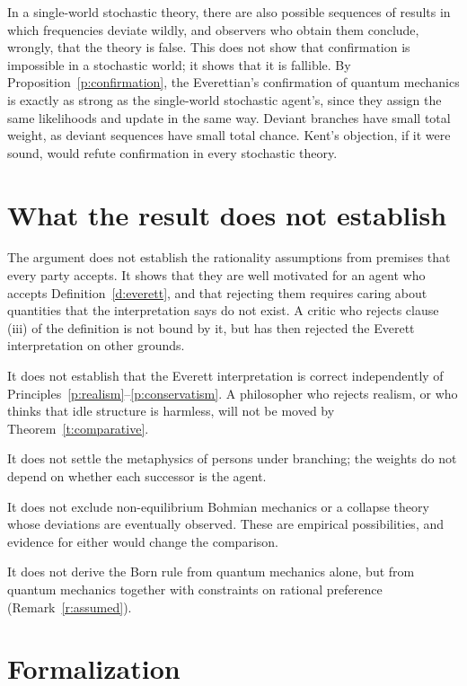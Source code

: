 \documentclass{situationist-preprint}
\begin{document}
\begin{reply}
In a single-world stochastic theory, there are also possible sequences of results in which frequencies deviate wildly, and observers who obtain them conclude, wrongly, that the theory is false. This does not show that confirmation is impossible in a stochastic world; it shows that it is fallible. By Proposition~\ref{p:confirmation}, the Everettian's confirmation of quantum mechanics is exactly as strong as the single-world stochastic agent's, since they assign the same likelihoods and update in the same way. Deviant branches have small total weight, as deviant sequences have small total chance. Kent's objection, if it were sound, would refute confirmation in every stochastic theory.
\end{reply}

\section{What the result does not establish}\label{s:limits}

The argument does not establish the rationality assumptions from premises that every party accepts. It shows that they are well motivated for an agent who accepts Definition~\ref{d:everett}, and that rejecting them requires caring about quantities that the interpretation says do not exist. A critic who rejects clause (iii) of the definition is not bound by it, but has then rejected the Everett interpretation on other grounds.

It does not establish that the Everett interpretation is correct independently of Principles~\ref{p:realism}--\ref{p:conservatism}. A philosopher who rejects realism, or who thinks that idle structure is harmless, will not be moved by Theorem~\ref{t:comparative}.

It does not settle the metaphysics of persons under branching; the weights do not depend on whether each successor is the agent.

It does not exclude non-equilibrium Bohmian mechanics or a collapse theory whose deviations are eventually observed. These are empirical possibilities, and evidence for either would change the comparison.

It does not derive the Born rule from quantum mechanics alone, but from quantum mechanics together with constraints on rational preference (Remark~\ref{r:assumed}).

\section{Formalization}\label{s:formal}
\end{document}
